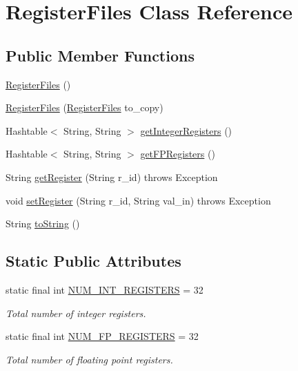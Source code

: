 \hypertarget{classRegisterFiles}{
\section{RegisterFiles Class Reference}
\label{classRegisterFiles}
}
\subsection*{Public Member Functions}
\begin{DoxyCompactItemize}
\item 
\hyperlink{classRegisterFiles_aef4ab4cab2d2cc79b9cbf651853f5349}{RegisterFiles} ()
\item 
\hyperlink{classRegisterFiles_a2aae18c5c9abcb311e8a425ab7215000}{RegisterFiles} (\hyperlink{classRegisterFiles}{RegisterFiles} to\_\-copy)
\item 
Hashtable$<$ String, String $>$ \hyperlink{classRegisterFiles_ad11babbe63b35dc5c0cde04158a79be7}{getIntegerRegisters} ()
\item 
Hashtable$<$ String, String $>$ \hyperlink{classRegisterFiles_a5e76f5637fa7975b365bb17c94b405bc}{getFPRegisters} ()
\item 
String \hyperlink{classRegisterFiles_aa31a4ef3fd261434e788bd0b5c7e5c71}{getRegister} (String r\_\-id)  throws Exception
\item 
void \hyperlink{classRegisterFiles_a8c750398bebe4a19b9d7db61f8affe69}{setRegister} (String r\_\-id, String val\_\-in)  throws Exception
\item 
String \hyperlink{classRegisterFiles_a72d8f3fe46917e2a365cbc255bfc4dc2}{toString} ()
\end{DoxyCompactItemize}
\subsection*{Static Public Attributes}
\begin{DoxyCompactItemize}
\item 
static final int \hyperlink{classRegisterFiles_acddf439e364d3aae0d80304b9a48cddc}{NUM\_\-INT\_\-REGISTERS} = 32
\begin{DoxyCompactList}\small\item\em Total number of integer registers. \item\end{DoxyCompactList}\item 
static final int \hyperlink{classRegisterFiles_aa00e6ad5b82f53a4b9afd7187f3a4245}{NUM\_\-FP\_\-REGISTERS} = 32
\begin{DoxyCompactList}\small\item\em Total number of floating point registers. \item\end{DoxyCompactList}\end{DoxyCompactItemize}
